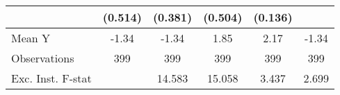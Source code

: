 {\begin{tabular}{l*{5}{c}}
            &     (0.514)         &     (0.381)         &     (0.504)         &     (0.136)         &                     \\
\midrule
Mean Y      &       -1.34         &       -1.34         &        1.85         &        2.17         &       -1.34         \\
Observations&         399         &         399         &         399         &         399         &         399         \\
Exc. Inst. F-stat&                     &      14.583         &      15.058         &       3.437         &       2.699         \\
\bottomrule
\end{tabular}
}
